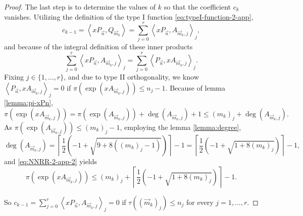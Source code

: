 \documentclass[12pt,a4]{report}
\theoremstyle{plain}
\newcommand{\prodesc}[2]{\left\langle #1 , #2 \right\rangle}
\begin{document}
\begin{proof}
        The last step is to determine the values of $k$ so that the coefficient $c_k$ vanishes. Utilizing the definition of the type I function \eqref{eq:typeI-function-2-app}, 
        $$
        c_{k-1}=\prodesc{xP_{\vec n}}{Q_{\vec m_k}} = \sum_{j=0}^r \prodesc{xP_{\vec n}}{A_{\vec m_k,j}}_j,
        $$
        and because of the integral definition of these inner products $$ \displaystyle\sum_{j=0}^r \prodesc{xP_{\vec n}}{A_{\vec m_k,j}}_j=\displaystyle\sum_{j=0}^r \prodesc{P_{\vec n}}{xA_{\vec m_k,j}}_j.$$ Fixing $j\in\{1,\dots,r\}$, and due to type II orthogonality, we know $\prodesc{P_{\vec n}}{xA_{\vec m_k,j}}_j=0$ if $\pi(\exp(xA_{\vec m_k,j}))\leq n_j-1$. Because of lemma \ref{lemma:pi-xPn}, 
        \begin{equation}
            \label{eq:NNRR-2-app-2}
            \pi(\exp(xA_{\vec m_k,j})) = \pi(\exp(A_{\vec m_k,j})) + \deg(A_{\vec m_k,j}) +1 \leq (m_k)_j + \deg(A_{\vec m_k,j}).
        \end{equation}
        As $\pi(\exp(A_{\vec m_k,j}))\leq (m_k)_j -1$, employing the lemma \ref{lemma:degree}, 
        $$
        \deg(A_{\vec m_k,j}) = \left\lceil \frac 1 2 (-1 + \sqrt{9+8((m_k)_j-1)})\right\rceil -1 =  \left\lceil \frac 1 2 (-1 + \sqrt{1+8(m_k)_j})\right\rceil -1,
        $$
        and \eqref{eq:NNRR-2-app-2} yields 
        $$
        \pi(\exp(xA_{\vec m_k,j})) \leq (m_k)_j + \left\lceil \frac 1 2 (-1 + \sqrt{1+8(m_k)_j})\right\rceil -1.
        $$

        So $c_{k-1} = \displaystyle\sum_{j=0}^r \prodesc{xP_{\vec n}}{A_{\vec m_k,j}}_j = 0$ if $\tau((\vec m_k)_j) \leq n_j$ for every $j=1,\dots,r$. 

    \end{proof}
\end{document}
